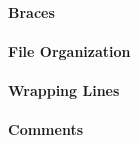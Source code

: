 \paragraph{Braces}
\begin{itemize}
\end{itemize}

\paragraph{File Organization}
\begin{itemize}
\end{itemize}

\paragraph{Wrapping Lines}
\begin{itemize}
\end{itemize}

\paragraph{Comments}
\begin{itemize}
\end{itemize}

